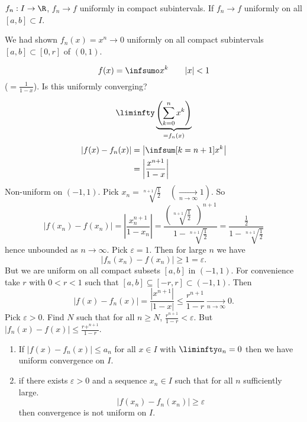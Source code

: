 \documentclass[10pt, a4paper]{article}
\begin{document}
\begin{definition}
    $f_n : I \to \R$,
    $f_n \to f$ uniformly in compact subintervals.
    If $f_n \to f$ uniformly on all $[a, b] \subset I$.
\end{definition}

We had shown $f_n(x) = x ^ n \to 0$ uniformly on all compact subintervals $[a, b] \subset [0, r]$ of $(0, 1)$.

\begin{example}
    \[
    f(x) = \infsumo x ^ k\qquad|x| < 1
    \]
    ($= \frac{1}{1 - x}$).
    Is this uniformly converging?

    \begin{solution}
        \[
        \liminfty\underbrace{\left(\sum_{k = 0}^{n}x ^ k\right)}_{=f_n(x)}
        \]
        \begin{align*}
            |f(x) - f_n(x)| &= \left|\infsum[k = n + 1]x ^ k\right| \\
            &= \left|\frac{x ^ {n + 1}}{1 - x}\right|
        \end{align*}
        Non-uniform on $(-1, 1)$.
        Pick $x_n = \sqrt[n + 1]{\frac{1}{2}}\quad(\xrightarrow[n \to \infty]{} 1)$.
        So
        \[
        |f(x_n) - f(x_n)| = \left|\frac{x_n ^ {n + 1}}{1 - x_n}\right| = \frac{\left(\sqrt[n + 1]{\frac{1}{2}}\phantom{1}\right) ^ {n + 1}}{1 - \sqrt[n + 1]{\frac{1}{2}}} = \frac{\frac{1}{2}}{1 - \sqrt[n + 1]{\frac{1}{2}}}
        \]
        hence unbounded as $n \to \infty$.
        Pick $\varepsilon = 1$.
        Then for large $n$ we have
        \[
        |f_n(x_n) - f(x_n)| \geq 1 = \varepsilon.
        \]
        But we are uniform on all compact subsets $[a, b]$ in $(-1, 1)$.
        For convenience take $r$ with $0 < r < 1$ such that $[a, b] \subseteq [-r, r] \subset (-1, 1)$.
        Then
        \[
        |f(x) - f_n(x)| = \frac{|x ^ {n + 1}|}{|1 - x|} \leq \frac{r ^ {n + 1}}{1 - r} \xrightarrow[n \to \infty]{} 0.
        \]
        Pick $\varepsilon > 0$.
        Find $N$ such that for all $n \geq N$,
        $\frac{r ^ {n + 1}}{1 - r} < \varepsilon$.
        But $|f_n(x) - f(x)| \leq \frac{r + ^ {n + 1}}{1 - r}$.
    \end{solution}
\end{example}

\begin{lemma}[Criterion]
    \begin{enumerate}[label = (\roman*)]
        \item If $|f(x) - f_n(x)| \leq a_n$ for all $x \in I$ with $\liminfty a_n = 0$ then we have uniform convergence on $I$.

        \item if there exists $\varepsilon > 0$ and a sequence $x_n \in I$ such that for all $n$ sufficiently large.
        \[
        |f(x_n) - f_n(x_n)| \geq \varepsilon
        \]
        then convergence is not uniform on $I$.
    \end{enumerate}
\end{lemma}
\end{document}
